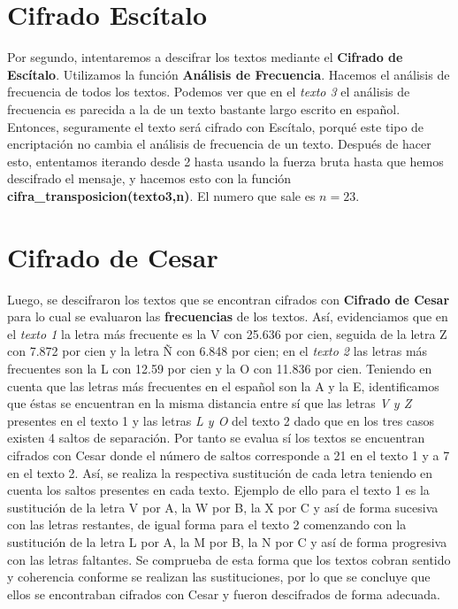 \documentclass{article}
\begin{document}
\section{Cifrado Escítalo}
	Por segundo, intentaremos a descifrar los textos mediante el \textbf{Cifrado de Escítalo}. Utilizamos la función \textbf{Análisis de Frecuencia}.
	Hacemos el análisis de frecuencia de todos los textos. Podemos ver que en el \emph{texto 3} el análisis de frecuencia es parecida a la de un texto bastante largo escrito en español. Entonces, seguramente el texto será cifrado con Escítalo, porqué este tipo de encriptación no cambia el análisis de frecuencia de un texto.
	Después de hacer esto, ententamos iterando desde 2 hasta usando la fuerza bruta hasta que hemos descifrado el mensaje, y hacemos esto con la función \textbf{cifra\_transposicion(texto3,n)}. El numero que sale es $n=23$.
	
\section{Cifrado de Cesar}
	Luego, se descifraron los textos que se encontran cifrados con \textbf{Cifrado de Cesar} para lo cual se evaluaron las \textbf{frecuencias} de los textos. Así, evidenciamos que en el \emph{texto 1} la letra más frecuente es la V con 25.636 por cien, seguida de la letra Z con 7.872 por cien y la letra Ñ con 6.848 por cien; en el \emph{texto 2} las letras más frecuentes son la L con 12.59 por cien y la O con 11.836 por cien.
	Teniendo en cuenta que las letras más frecuentes en el español son la A y la E, identificamos que éstas se encuentran en la misma distancia entre sí que las letras \emph{V y Z} presentes en el texto 1 y las letras \emph{L y O} del texto 2 dado que en los tres casos existen 4 saltos de separación. Por tanto se evalua sí los textos se encuentran cifrados con Cesar donde el número de saltos corresponde a 21 en el texto 1 y a 7 en el texto 2. Así, se realiza la respectiva sustitución de cada letra teniendo en cuenta los saltos presentes en cada texto. Ejemplo de ello para el texto 1 es la sustitución de la letra V por A, la W por B, la X por C y así de forma sucesiva con las letras restantes, de igual forma para el texto 2 comenzando con la sustitución de la letra L por A, la M por B, la N por C y así de forma progresiva con las letras faltantes.
	Se comprueba de esta forma que los textos cobran sentido y coherencia conforme se realizan las sustituciones, por lo que se concluye que ellos se encontraban cifrados con Cesar y fueron descifrados de forma adecuada. 
	
\end{document}
